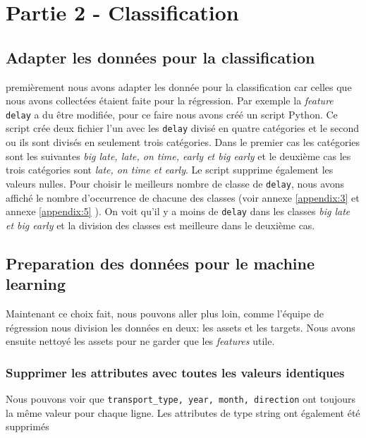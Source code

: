 \section{Partie 2 - Classification}
\subsection{Adapter les données pour la classification}
premièrement nous avons adapter les donnée pour la classification car celles que nous avons collectées étaient faite pour la régression. Par exemple la \textit{feature} \lstinline!delay! a du être modifiée, pour ce faire nous avons créé un script Python. Ce script crée deux fichier l'un avec les \lstinline!delay! divisé en quatre catégories et le second ou ils sont divisés en seulement trois catégories. Dans le premier cas les catégories sont les suivantes \textit{big late, late, on time, early et big early} et le deuxième cas les trois catégories sont \textit{late, on time et early}. Le script supprime également les valeurs nulles. Pour choisir le meilleurs nombre de classe de \lstinline!delay!, nous avons affiché le nombre d'occurrence de chacune des classes (voir annexe \ref{appendix:3} et annexe \ref{appendix:5} ). On voit qu'il y a moins de \lstinline!delay! dans les classes \textit{big late et big early} et la division des classes est meilleure dans le deuxième cas.


\subsection{Preparation des données pour le machine learning}
Maintenant ce choix fait, nous pouvons aller plus loin, comme l'équipe de régression nous division les données en deux: les assets et les targets. Nous avons ensuite nettoyé les assets pour ne garder que les \textit{features} utile.

\subsubsection{Supprimer les attributes avec toutes les valeurs identiques}


Nous pouvons voir que \lstinline!transport_type, year, month, direction! ont toujours la même valeur pour chaque ligne. Les attributes de type string ont également été supprimés

